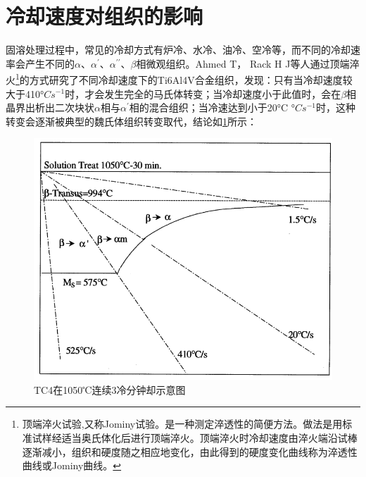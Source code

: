 \documentclass[
class = book,
zihao = -4,
font = noto,
paper = a4paper,
openany
]{easybook}
\newcommand{\ti}{Ti6Al4V}
\begin{document}
\section{冷却速度对组织的影响}
固溶处理过程中，常见的冷却方式有炉冷、水冷、油冷、空冷等，而不同的冷却速率会产生不同的$ \alpha  $、$ \alpha  ^{\prime}$、$ \alpha  ^{\prime\prime}$、$ \beta$相微观组织\cite{malinovModellingCorrelationProcessing2001}。Ahmed T， Rack H J等人通过顶端淬火\footnote{顶端淬火试验,又称Jominy试验。是一种测定淬透性的简便方法。做法是用标准试样经适当奥氏体化后进行顶端淬火。顶端淬火时冷却速度由淬火端沿试棒逐渐减小，组织和硬度随之相应地变化，由此得到的硬度变化曲线称为淬透性曲线或Jominy曲线。}的方式研究\cite{ahmedPhaseTransformationsCooling1998}了不同冷却速度下的\ti 合金组织，发现：只有当冷却速度较大于410°$C  s^{- 1} $时，才会发生完全的马氏体转变；当冷却速度小于此值时，会在$ \beta $相晶界出析出二次块状$\alpha  $相与$ \alpha^{\prime} $相的混合组织；当冷速达到小于20°C °$C  s^{- 1} $时，这种转变会逐渐被典型的魏氏体组织转变取代，结论如\ref{fig:tc41050c3}所示：
\begin{figure}[h!]
	\centering
	\includegraphics[width=0.7\linewidth]{TC4在1050℃连续3冷分钟却示意图}
	\caption{TC4在1050℃连续3冷分钟却示意图}
	\label{fig:tc41050c3}
\end{figure}
\end{document}

